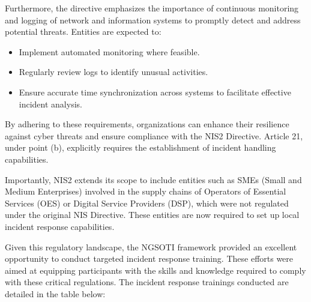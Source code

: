 Furthermore, the directive emphasizes the importance of continuous monitoring and logging of network and information systems to promptly detect and address potential threats. Entities are expected to:

\begin{itemize}
	\item Implement automated monitoring where feasible.
	\item Regularly review logs to identify unusual activities.
	\item Ensure accurate time synchronization across systems to facilitate effective incident analysis.
\end{itemize}

By adhering to these requirements, organizations can enhance their resilience against cyber threats and ensure compliance with the NIS2 Directive. Article 21, under point (b), explicitly requires the establishment of incident handling capabilities.

Importantly, NIS2 extends its scope to include entities such as SMEs (Small and Medium Enterprises) involved in the supply chains of Operators of Essential Services (OES) or Digital Service Providers (DSP), which were not regulated under the original NIS Directive. These entities are now required to set up local incident response capabilities.

Given this regulatory landscape, the NGSOTI framework provided an excellent opportunity to conduct targeted incident response training. These efforts were aimed at equipping participants with the skills and knowledge required to comply with these critical regulations. The incident response trainings conducted are detailed in the table below:


